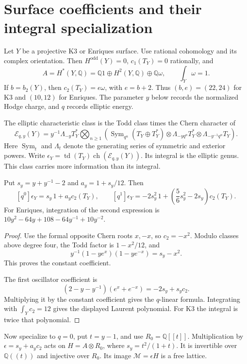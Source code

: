 \section{Surface coefficients and their integral specialization}

Let \(Y\) be a projective K3 or Enriques surface.
Use rational cohomology and its complex orientation.
Then \(H^{\mathrm{odd}}(Y)=0\), \(c_1(T_Y)=0\) rationally, and
\[
 A=H^*(Y,\mathbb Q)
   =\mathbb Q1\oplus H^2(Y,\mathbb Q)\oplus\mathbb Q\omega,
 \qquad \int_Y\omega=1.
\]
If \(b=b_2(Y)\), then \(c_2(T_Y)=e\omega\), with \(e=b+2\).
Thus \((b,e)=(22,24)\) for K3 and \((10,12)\) for Enriques.
The parameter \(y\) below records the normalized Hodge charge,
and \(q\) records elliptic energy.

The elliptic characteristic class is the Todd class times the
Chern character of
\[
 \mathcal E_{q,y}(Y)=
 y^{-1}\Lambda_{-y}T_Y^*
 \bigotimes_{n\geq1}
 \left(
 \operatorname{Sym}_{q^n}(T_Y\oplus T_Y^*)
 \otimes\Lambda_{-yq^n}T_Y^*
 \otimes\Lambda_{-y^{-1}q^n}T_Y
 \right).
\]
Here \(\operatorname{Sym}_t\) and \(\Lambda_t\) denote the
generating series of symmetric and exterior powers.
Write \(\epsilon_Y=\operatorname{td}(T_Y)
\operatorname{ch}(\mathcal E_{q,y}(Y))\).
Its integral is the elliptic genus.
This class carries more information than its integral.

\begin{proposition}\label{mht:prop:compact-surface-class}
Put \(s_y=y+y^{-1}-2\) and \(a_y=1+s_y/12\).
Then
\[
 [q^0]\epsilon_Y=s_y\,1+a_yc_2(T_Y),\qquad
 [q^1]\epsilon_Y=-2s_y^2\,1+
                 \left(\frac56s_y^2-2s_y\right)c_2(T_Y).
\]
For Enriques, integration of the second expression is
\(10y^2-64y+108-64y^{-1}+10y^{-2}\).
\end{proposition}
\begin{proof}
Use the formal opposite Chern roots \(x,-x\), so \(c_2=-x^2\).
Modulo classes above degree four, the Todd factor is
\(1-x^2/12\), and
\[
 y^{-1}(1-ye^x)(1-ye^{-x})=s_y-x^2.
\]
This proves the constant coefficient.

The first oscillator coefficient is
\[
 (2-y-y^{-1})(e^x+e^{-x})=-2s_y+s_yc_2.
\]
Multiplying it by the constant coefficient gives the
\(q\)-linear formula. Integrating with \(\int_Yc_2=12\)
gives the displayed Laurent polynomial.
For K3 the integral is twice that polynomial.
\end{proof}

Now specialize to \(q=0\), put \(t=y-1\), and use
\(R_0=\mathbb Q[[t]]\).
Multiplication by
\(\epsilon=s_y+a_yc_2\) acts on
\(H=A\otimes R_0\), where
\(s_y=t^2/(1+t)\).
It is invertible over \(\mathbb Q((t))\) and injective over
\(R_0\). Its image \(\mathcal M=\epsilon H\) is a free lattice.

